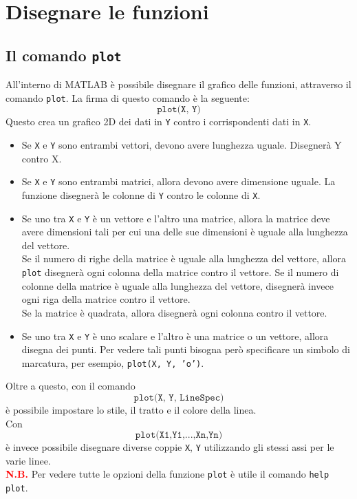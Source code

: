 \chapter{Disegnare le funzioni}
\section{Il comando \texttt{plot}}
All'interno di MATLAB è possibile disegnare il grafico delle funzioni, attraverso il comando \texttt{plot}.
La firma di questo comando è la seguente:
$$ \texttt{plot(X, Y)} $$
Questo crea un grafico 2D dei dati in \texttt{Y} contro i corrispondenti dati in \texttt{X}.
\begin{itemize}
	\item 	Se \texttt{X} e \texttt{Y} sono entrambi vettori, devono avere lunghezza uguale. Disegnerà Y contro X.
	\item	Se \texttt{X} e \texttt{Y} sono entrambi matrici, allora devono avere dimensione uguale. La funzione
			disegnerà le colonne di \texttt{Y} contro le colonne di \texttt{X}.
	\item	Se uno tra \texttt{X} e \texttt{Y} è un vettore e l'altro una matrice, allora la matrice deve avere
			dimensioni tali per cui una delle sue dimensioni è uguale alla lunghezza del vettore. \\
			Se il numero di righe della matrice è uguale alla lunghezza del vettore, allora \texttt{plot} 
			disegnerà ogni colonna della matrice contro il vettore. Se il numero di colonne della matrice è uguale
			alla lunghezza del vettore, disegnerà invece ogni riga della matrice contro il vettore. \\
			Se la matrice è quadrata, allora disegnerà ogni colonna contro il vettore.
	\item	Se uno tra \texttt{X} e \texttt{Y} è uno scalare e l'altro è una matrice o un vettore, allora disegna
			dei punti. Per vedere tali punti bisogna però specificare un simbolo di marcatura, per esempio,
			\texttt{plot(X, Y, 'o')}.
\end{itemize}

Oltre a questo, con il comando $$\texttt{plot(X, Y, LineSpec)}$$ è possibile impostare lo stile, il tratto e il 
colore della linea. \break \\
Con $$\texttt{plot(X1,Y1,...,Xn,Yn)}$$ è invece possibile disegnare diverse coppie \texttt{X}, \texttt{Y} utilizzando 
gli stessi assi per le varie linee. \break \\

\textcolor{Red}{\textbf{N.B.}} Per vedere tutte le opzioni della funzione \texttt{plot} è utile il comando \texttt{help 
plot}.

